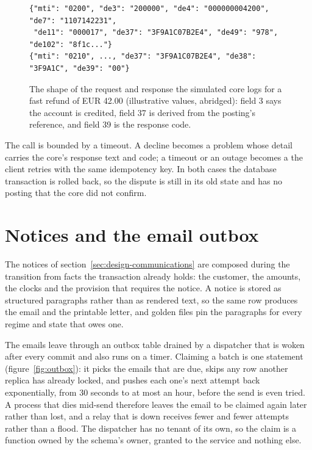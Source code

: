 \begin{figure}[htbp]
\begin{lstlisting}
{"mti": "0200", "de3": "200000", "de4": "000000004200", "de7": "1107142231",
 "de11": "000017", "de37": "3F9A1C07B2E4", "de49": "978", "de102": "8f1c..."}
{"mti": "0210", ..., "de37": "3F9A1C07B2E4", "de38": "3F9A1C", "de39": "00"}
\end{lstlisting}
\caption{The shape of the request and response the simulated core logs for a fast refund of EUR 42.00 (illustrative
values, abridged): field 3 says
the account is credited, field 37 is derived from the posting's reference, and field 39 is the response code.}
\label{fig:iso}
\end{figure}

The call is bounded by a timeout. A decline becomes a  problem whose detail carries the core's response
text and code; a timeout or an outage becomes a  the client retries with the same idempotency key. In both
cases the database transaction is rolled back, so the dispute is still in its old state and has no posting that
the core did not confirm.

\section{Notices and the email outbox}
\label{sec:impl-notices}

The notices of section~\ref{sec:design-communications} are composed during the transition from facts the
transaction already holds: the customer, the amounts, the clocks and the provision that requires the notice. A notice
is stored as structured paragraphs rather than as rendered text, so the same row produces the email and the
printable letter, and golden files pin the paragraphs for every regime and state that owes one.

The emails leave through an outbox table drained by a dispatcher that is woken after every commit and also runs on
a timer. Claiming a batch is one statement (figure~\ref{fig:outbox}): it picks the emails that are due, skips any
row another replica has already locked, and pushes each one's next attempt back exponentially, from 30 seconds
to at most an hour, before the send is even tried. A process that dies mid-send therefore leaves the email to be
claimed again later rather than lost, and a relay that is down receives fewer and fewer attempts rather than a flood.
The dispatcher has no tenant of its own, so the claim is a function owned by the schema's owner, granted to the
service and nothing else.

